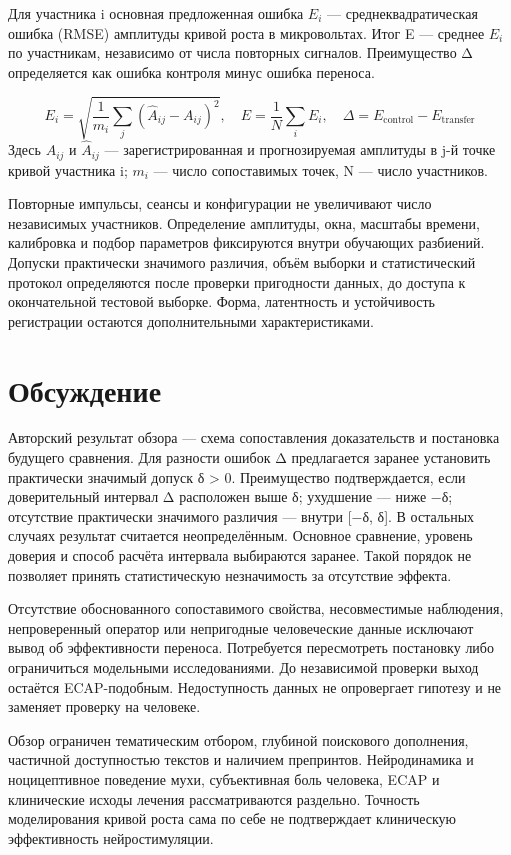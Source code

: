 \documentclass[12pt,a4paper]{article}
\begin{document}
Для участника i основная предложенная ошибка \ensuremath{E_{i}} — среднеквадратическая ошибка (RMSE) амплитуды кривой роста в микровольтах. Итог E — среднее \ensuremath{E_{i}} по участникам, независимо от числа повторных сигналов. Преимущество Δ определяется как ошибка контроля минус ошибка переноса.\par
\[E_i=\sqrt{\frac{1}{m_i}\sum_j(\widehat A_{ij}-A_{ij})^2},\quad E=\frac{1}{N}\sum_i E_i,\quad\Delta=E_{\mathrm{control}}-E_{\mathrm{transfer}}\]
Здесь \ensuremath{A_{ij}} и \ensuremath{\widehat{A}_{ij}} — зарегистрированная и прогнозируемая амплитуды в j-й точке кривой участника i; \ensuremath{m_{i}} — число сопоставимых точек, N — число участников.\par
Повторные импульсы, сеансы и конфигурации не увеличивают число независимых участников. Определение амплитуды, окна, масштабы времени, калибровка и подбор параметров фиксируются внутри обучающих разбиений. Допуски практически значимого различия, объём выборки и статистический протокол определяются после проверки пригодности данных, до доступа к окончательной тестовой выборке. Форма, латентность и устойчивость регистрации остаются дополнительными характеристиками.\par
\section*{Обсуждение}
Авторский результат обзора — схема сопоставления доказательств и постановка будущего сравнения. Для разности ошибок Δ предлагается заранее установить практически значимый допуск δ > 0. Преимущество подтверждается, если доверительный интервал Δ расположен выше δ; ухудшение — ниже −δ; отсутствие практически значимого различия — внутри [−δ, δ]. В остальных случаях результат считается неопределённым. Основное сравнение, уровень доверия и способ расчёта интервала выбираются заранее. Такой порядок не позволяет принять статистическую незначимость за отсутствие эффекта.\par
Отсутствие обоснованного сопоставимого свойства, несовместимые наблюдения, непроверенный оператор или непригодные человеческие данные исключают вывод об эффективности переноса. Потребуется пересмотреть постановку либо ограничиться модельными исследованиями. До независимой проверки выход остаётся ECAP-подобным. Недоступность данных не опровергает гипотезу и не заменяет проверку на человеке.\par
Обзор ограничен тематическим отбором, глубиной поискового дополнения, частичной доступностью текстов и наличием препринтов. Нейродинамика и ноцицептивное поведение мухи, субъективная боль человека, ECAP и клинические исходы лечения рассматриваются раздельно. Точность моделирования кривой роста сама по себе не подтверждает клиническую эффективность нейростимуляции.\par
\end{document}
